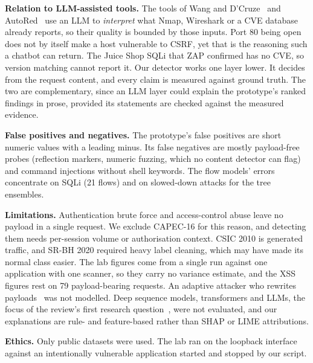 \documentclass[conference]{IEEEtran}
\begin{document}
\textbf{Relation to LLM-assisted tools.} The tools of Wang and D'Cruze~\cite{wang2024} and
AutoRed~\cite{khairmode2026} use an LLM to \emph{interpret} what Nmap, Wireshark or a CVE database
already reports, so their quality is bounded by those inputs. Port 80 being open does not
by itself make a host vulnerable to CSRF, yet that is the reasoning such a chatbot can return. The
Juice Shop SQLi that ZAP confirmed has no CVE, so version matching cannot report it. Our detector
works one layer lower. It decides from the request content, and every claim is measured against
ground truth. The two are complementary, since an LLM layer could explain the prototype's ranked
findings in prose, provided its statements are checked against the measured evidence.

\textbf{False positives and negatives.} The prototype's false positives are short numeric values with a
leading minus. Its false negatives are mostly payload-free probes (reflection markers, numeric fuzzing,
which no content detector can flag) and command injections without shell keywords. The flow
models' errors concentrate on SQLi (21 flows) and on slowed-down attacks for the tree ensembles.

\textbf{Limitations.} Authentication brute force and access-control abuse leave no payload in a single
request. We exclude CAPEC-16 for this reason, and detecting them needs per-session volume or
authorisation context. CSIC 2010 is generated traffic, and SR-BH 2020 required heavy label cleaning,
which may have made its normal class easier. The lab figures come from a single run against one
application with one scanner, so they carry no variance estimate, and the XSS figures rest on 79
payload-bearing requests. An adaptive attacker who rewrites payloads~\cite{qu2024} was not modelled. Deep sequence models,
transformers and LLMs, the focus of the review's first research question~\cite{fasla2026}, were not
evaluated, and our explanations are rule- and feature-based rather than SHAP or LIME attributions.

\textbf{Ethics.} Only public datasets were used. The lab ran on the loopback interface against an
intentionally vulnerable application started and stopped by our script.
\end{document}

